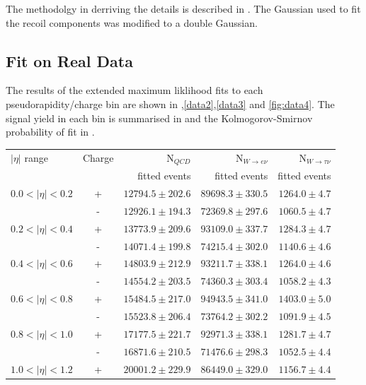 The methodolgy in derriving the details is described in .
The Gaussian used to fit the recoil components was modified to a double
Gaussian.


\subsection{Fit on Real Data}

The results of the extended maximum liklihood fits to each pseudorapidity/charge
bin are shown in ,\ref{data2},\ref{data3} and
\ref{fig:data4}.
The signal yield in each bin is summarised in  and
the Kolmogorov-Smirnov probability of fit in .

\begin{table}[htbp]
 \begin{center}
 \begin{tabular}{lcrrr}
\toprule
$|\eta|$ range &  Charge &  N$_{QCD}$     & N$_{W\rightarrow e \nu}$  & N$_{W\rightarrow \tau \nu}$ \\
               &         & fitted events & fitted events            & fitted events                 \\
\midrule
$0.0<| \eta |<0.2$ &  +& $12794.5 \pm 202.6$ &$89698.3\pm330.5$&$ 1264.0\pm4.7$ \\
                   &  -& $12926.1 \pm 194.3$ &$72369.8\pm297.6$&$ 1060.5\pm4.7$ \\ 
$0.2<| \eta |<0.4$ &  +& $13773.9 \pm 209.6$ &$93109.0\pm337.7$&$ 1284.3\pm4.7$ \\
                   &  -& $14071.4 \pm 199.8$ &$74215.4\pm302.0$&$ 1140.6\pm4.6$ \\ 
$0.4<| \eta |<0.6$ &  +& $14803.9 \pm 212.9$ &$93211.7\pm338.1$&$ 1264.0\pm4.6$ \\
                   &  -& $14554.2 \pm 203.5$ &$74360.3\pm303.4$&$ 1058.2\pm4.3$ \\ 
$0.6<| \eta |<0.8$ &  +& $15484.5 \pm 217.0$ &$94943.5\pm341.0$&$ 1403.0\pm5.0$ \\
                   &  -& $15523.8 \pm 206.4$ &$73764.2\pm302.2$&$ 1091.9\pm4.5$ \\ 
$0.8<| \eta |<1.0$ &  +& $17177.5 \pm 221.7$ &$92971.3\pm338.1$&$ 1281.7\pm4.7$ \\
                   &  -& $16871.6 \pm 210.5$ &$71476.6\pm298.3$&$ 1052.5\pm4.4$ \\ 
$1.0<| \eta |<1.2$ &  +& $20001.2 \pm 229.9$ &$86449.0\pm329.0$&$ 1156.7\pm4.4$ \\

\end{tabular}
\end{center}
\end{table}
